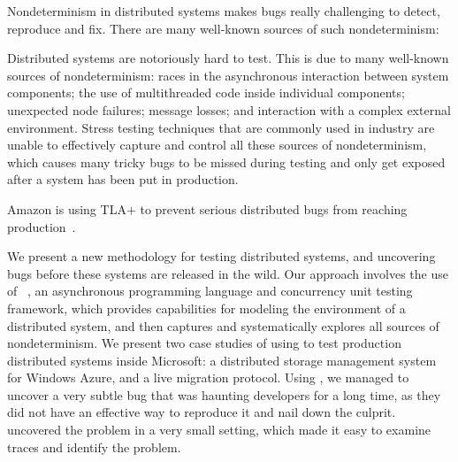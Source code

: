

Nondeterminism in distributed systems makes bugs really challenging to detect, reproduce and fix. There are many well-known sources of such nondeterminism:

Distributed systems are notoriously hard to test. This is due to many well-known sources of nondeterminism: races in the asynchronous interaction between system components; the use of multithreaded code inside individual components; unexpected node failures; message losses; and interaction with a complex external environment. Stress testing techniques that are commonly used in industry are unable to effectively capture and control all these sources of nondeterminism, which causes many tricky bugs to be missed during testing and only get exposed after a system has been put in production.

Amazon is using TLA+ to prevent serious distributed bugs from reaching production~\cite{newcombe2015aws}.

We present a new methodology for testing distributed systems, and uncovering bugs before these systems are released in the wild. Our approach involves the use of \psharp~\cite{deligiannis2015psharp}, an asynchronous programming language and concurrency unit testing framework, which provides capabilities for modeling the environment of a distributed system, and then captures and systematically explores all sources of nondeterminism. We present two case studies of using \psharp to test production distributed systems inside Microsoft: a distributed storage management system for Windows Azure, and a live migration protocol. Using \psharp, we managed to uncover a very subtle bug that was haunting developers for a long time, as they did not have an effective way to reproduce it and nail down the culprit. \psharp uncovered the problem in a very small setting, which made it easy to examine traces and identify the problem.
